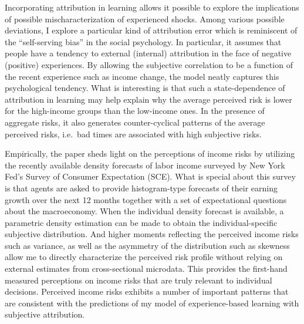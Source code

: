 \documentclass[12pt,notitlepage,onecolumn,aps,pra]{article}
\begin{document}
Incorporating attribution in learning allows it possible to explore the
implications of possible mischaracterization of experienced shocks.
Among various possible deviations, I explore a particular kind of
attribution error which is reminiscent of the ``self-serving bias'' in
the social psychology. In particular, it assumes that people have a
tendency to external (internal) attribution in the face of negative
(positive) experiences. By allowing the subjective correlation to be a
function of the recent experience such as income change, the model
neatly captures this psychological tendency. What is interesting is that
such a state-dependence of attribution in learning may help explain why
the average perceived risk is lower for the high-income groups than the
low-income ones. In the presence of aggregate risks, it also generates
counter-cyclical patterns of the average perceived risks, i.e.~bad times
are associated with high subjective risks.

Empirically, the paper sheds light on the perceptions of income risks by
utilizing the recently available density forecasts of labor income
surveyed by New York Fed's Survey of Consumer Expectation (SCE). What is
special about this survey is that agents are asked to provide
histogram-type forecasts of their earning growth over the next 12 months
together with a set of expectational questions about the macroeconomy.
When the individual density forecast is available, a parametric density
estimation can be made to obtain the individual-specific subjective
distribution. And higher moments reflecting the perceived income risks
such as variance, as well as the asymmetry of the distribution such as
skewness allow me to directly characterize the perceived risk profile
without relying on external estimates from cross-sectional microdata.
This provides the first-hand measured perceptions on income risks that
are truly relevant to individual decisions. Perceived income risks
exhibits a number of important patterns that are consistent with the
predictions of my model of experience-based learning with subjective
attribution.
\end{document}
